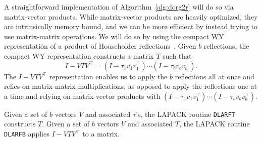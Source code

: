 \documentclass[12pt]{article}
\newcommand{\nb}{b}
\begin{document}
    A straightforward implementation of Algorithm~\ref{alg:dorg2r} will do so via matrix-vector products. While matrix-vector products
    are heavily optimized, they are intrinsically memory bound, and we can be more efficient by instead trying to use matrix-matrix
    operations. We will do so by using the compact WY representation of a product of Householder reflections~\cite{doi:10.1137/0910005}.
    Given $\nb$ reflections, 
    the compact WY representation constructs a matrix $T$ such that 
    \[
        I - VTV^\top = \left(I - \tau_1 v_1v_1^\top\right)\cdots\left(I - \tau_{\nb}v_{\nb}v_{\nb}^\top\right).
    \]
    The $I - VTV^\top$ representation enables us to apply the $\nb$ reflections all at once and relies on matrix-matrix multiplications, 
    as opposed to apply the reflections one at a time and relying on matrix-vector products with $\left(I - \tau_1 v_1v_1^\top\right)\cdots\left(I - \tau_{\nb}v_{\nb}v_{\nb}^\top\right)$.

    Given a set of $\nb$ vectors $V$ and associated $\tau$'s, the LAPACK routine \verb|DLARFT| constructs $T$.
    Given a set of $\nb$ vectors $V$ and associated $T$, the LAPACK routine \verb|DLARFB| applies $I - VTV^\top$ to a matrix.
\end{document}
